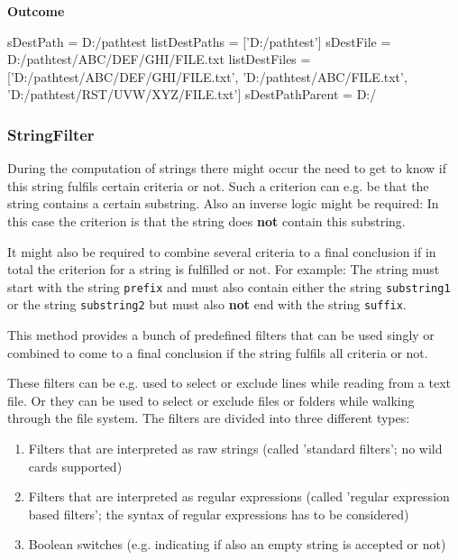 \textbf{Outcome}

\begin{robotlog}
sDestPath       = D:/pathtest
listDestPaths   = ['D:/pathtest']
sDestFile       = D:/pathtest/ABC/DEF/GHI/FILE.txt
listDestFiles   = ['D:/pathtest/ABC/DEF/GHI/FILE.txt', 'D:/pathtest/ABC/FILE.txt', 'D:/pathtest/RST/UVW/XYZ/FILE.txt']
sDestPathParent = D:/
\end{robotlog}

\newpage

\subsubsection{StringFilter}

During the computation of strings there might occur the need to get to know if this string fulfils certain criteria or not.
Such a criterion can e.g. be that the string contains a certain substring. Also an inverse logic might be required:
In this case the criterion is that the string does \textbf{not} contain this substring.

It might also be required to combine several criteria to a final conclusion if in total the criterion for a string is fulfilled or not.
For example: The string must start with the string \texttt{prefix} and must also contain either the string \texttt{substring1} or
the string \texttt{substring2} but must also \textbf{not} end with the string \texttt{suffix}.

This method provides a bunch of predefined filters that can be used singly or combined to come to a final conclusion if the string fulfils all criteria or not.

These filters can be e.g. used to select or exclude lines while reading from a text file. Or they can be used to select or exclude files or folders
while walking through the file system. The filters are divided into three different types:

\begin{enumerate}
   \item Filters that are interpreted as raw strings (called 'standard filters'; no wild cards supported)
   \item Filters that are interpreted as regular expressions (called 'regular expression based filters'; the syntax of regular expressions has to be considered)
   \item Boolean switches (e.g. indicating if also an empty string is accepted or not)
\end{enumerate}

